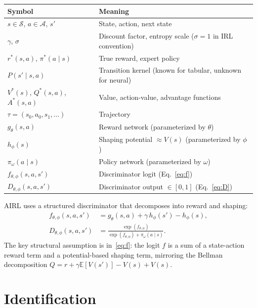 \documentclass[11pt]{article}
\newcommand{\E}{\mathbb{E}}
\newcommand{\calA}{\mathcal{A}}
\newcommand{\calS}{\mathcal{S}}
\begin{document}
\begin{table}[h!]
\centering\small
\begin{tabular}{ll}
\toprule
Symbol & Meaning \\
\midrule
$s \in \calS$, $a \in \calA$, $s'$ & State, action, next state \\
$\gamma$, $\sigma$ & Discount factor, entropy scale ($\sigma = 1$ in IRL convention) \\
$r^*(s,a)$, $\pi^*(a \mid s)$ & True reward, expert policy \\
$P(s' \mid s,a)$ & Transition kernel (known for tabular, unknown for neural) \\
$V^*(s)$, $Q^*(s,a)$, $A^*(s,a)$ & Value, action-value, advantage functions \\
$\tau = (s_0, a_0, s_1, \ldots)$ & Trajectory \\
\midrule
$g_\theta(s,a)$ & Reward network (parameterized by $\theta$) \\
$h_\phi(s)$ & Shaping potential $\approx V(s)$ (parameterized by $\phi$) \\
$\pi_\omega(a \mid s)$ & Policy network (parameterized by $\omega$) \\
$f_{\theta,\phi}(s,a,s')$ & Discriminator logit (Eq.~\ref{eq:f}) \\
$D_{\theta,\phi}(s,a,s')$ & Discriminator output $\in [0,1]$ (Eq.~\ref{eq:D}) \\
\bottomrule
\end{tabular}
\end{table}
\FloatBarrier

AIRL uses a structured discriminator that decomposes into reward and shaping:
\begin{align}
f_{\theta,\phi}(s,a,s') &= g_\theta(s,a) + \gamma\, h_\phi(s') - h_\phi(s), \label{eq:f}\\[3pt]
D_{\theta,\phi}(s,a,s') &= \frac{\exp(f_{\theta,\phi})}{\exp(f_{\theta,\phi}) + \pi_\omega(a \mid s)}. \label{eq:D}
\end{align}
The key structural assumption is in~\eqref{eq:f}: the logit $f$ is a sum of a state-action reward term and a potential-based shaping term, mirroring the Bellman decomposition $Q = r + \gamma \E[V(s')] - V(s) + V(s)$.

\section{Identification}
\end{document}
